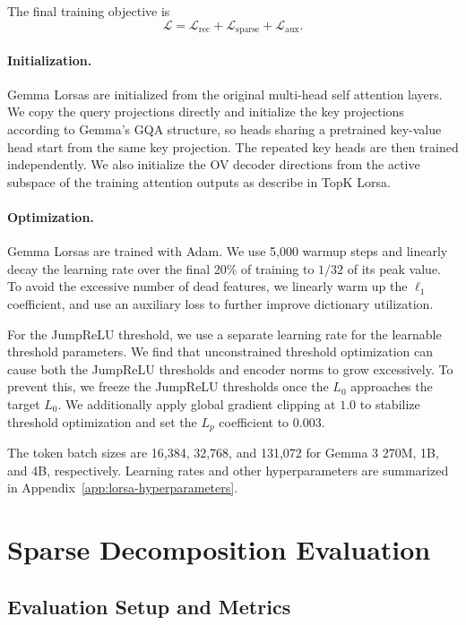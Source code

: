 \documentclass{article}
\begin{document}
The final training objective is
\begin{equation}
    \mathcal{L}
    =
    \mathcal{L}_{\mathrm{rec}}
    +
    \mathcal{L}_{\mathrm{sparse}}
    +
    \mathcal{L}_{\mathrm{aux}} .
\end{equation}

\paragraph{Initialization.}
Gemma Lorsas are initialized from the original multi-head self attention
layers. We copy the query projections directly and initialize the key
projections according to Gemma's GQA structure, so heads sharing a pretrained
key-value head start from the same key projection. The repeated key heads are
then trained independently. We also initialize the OV decoder directions from
the active subspace of the training attention outputs as describe in TopK Lorsa.

\paragraph{Optimization.}
Gemma Lorsas are trained with Adam. We use 5,000 warmup steps and linearly decay 
the learning rate over the final 20\% of training to $1/32$ of its peak value. 
To avoid the excessive number of dead features, we linearly warm up the $\ell_1$ 
coefficient, and use an auxiliary loss to further improve dictionary utilization.

For the JumpReLU threshold, we use a separate learning rate for the learnable threshold parameters. 
We find that unconstrained threshold optimization can cause both the JumpReLU thresholds and encoder 
norms to grow excessively. To prevent this, we freeze the JumpReLU thresholds once the $L_0$ approaches the target $L_0$. 
We additionally apply global gradient clipping at $1.0$ to stabilize 
threshold optimization and set the $L_p$ coefficient to $0.003$.

The token batch sizes are 16,384, 32,768, and 131,072 for Gemma 3 270M, 1B,
and 4B, respectively. Learning rates and other hyperparameters are summarized in
Appendix~\ref{app:lorsa-hyperparameters}.

\section{Sparse Decomposition Evaluation}
\label{sec:evaluation}

\subsection{Evaluation Setup and Metrics}
\end{document}
